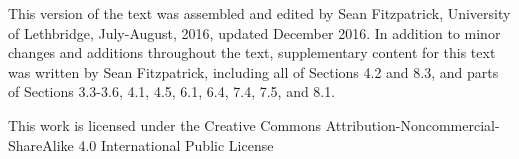 \vspace{1in}


This version of the text was assembled and edited by Sean Fitzpatrick, University of Lethbridge, July-August, 2016, updated December 2016. In addition to minor changes and additions throughout the text, supplementary content for this text was written by Sean Fitzpatrick, including all of Sections 4.2 and 8.3, and parts of Sections 3.3-3.6, 4.1, 4.5, 6.1, 6.4, 7.4, 7.5, and 8.1.

\medskip

This work is licensed under the Creative Commons Attribution-Noncommercial-ShareAlike 4.0 International Public License

